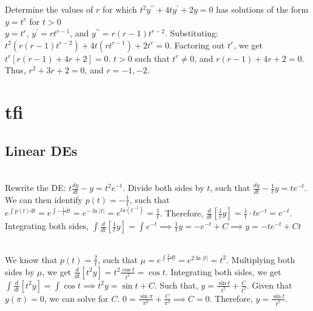 \documentclass{article}
\begin{document}
 {
  Determine the values of $r$ for which $t^2 y^{\prime \prime}+4 t y^{\prime}+2 y=0$ has solutions of the form $y=t^r$ for $t>0$
}
\sol \\
$y=t^r$, $y^{\prime}=rt^{r-1}$, and $y^{\prime \prime}=r(r-1)t^{r-2}$.
Substituting: $t^2(r(r-1)t^{r-2})+4t(rt^{r-1})+2t^r=0$.
Factoring out $t^r$, we get $t^r[r(r-1)+4r+2]=0$. $t > 0$ such that $t^r \neq 0$, and $r(r-1)+4r+2=0$. Thus, $r^2+3r+2=0$, and $\boxed{r=-1, -2}$.
\section{tfi}
\subsection{Linear DEs}
\sol \\
Rewrite the DE: $t \frac{dy}{dt} - y = t^2 e^{-t}$.
Divide both sides by $t$, such that $\frac{dy}{dt} - \frac{1}{t}y = t e^{-t}$.
We can then identify $p(t) = -\frac{1}{t}$, such that $e^{\int p(t) dt} = e^{\int -\frac{1}{t} dt} = e^{-\ln|t|} = e^{ln(t^{-1})} = \frac{1}{t}$.
Therefore, $\frac{d}{dt}[\frac{1}{t}y] = \frac{1}{t} \cdot t e^{-t} = e^{-t}$.
Integrating both sides, $\int \frac{d}{dt}[\frac{1}{t}y] = \int e^{-t} \implies \frac{1}{t}y = -e^{-t} + C \implies \boxed{y=-te^{-t} + Ct}$

\sol \\
We know that $p(t) = \frac{2}{t}$, such that $\mu = e^{\int \frac{2}{t} dt} = e^{2\ln|t|} = t^2$.
Multiplying both sides by $\mu$, we get $\frac{d}{dt}[t^2 y] = t^2 \frac{\cos t}{t^2} = \cos t$.
Integrating both sides, we get $\int \frac{d}{dt} [t^2 y] = \int \cos t \implies t^2 y = \sin t + C$.
Such that, $y=\frac{\sin t}{t^2} + \frac{C}{t^2}$. Given that $y(\pi) = 0$, we can solve for $C$.
$0 = \frac{\sin \pi}{\pi^2} + \frac{C}{\pi^2} \implies C = 0$. Therefore, $\boxed{y=\frac{\sin t}{t^2}}$.
\end{document}
